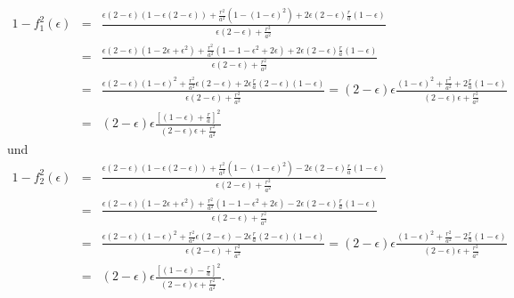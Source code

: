 \documentclass{book}
\begin{document}
\begin{eqnarray}
1 - f_1^2\left(\epsilon\right) & = & \frac{\epsilon\left(2 - \epsilon\right)\left(1 - \epsilon\left(2 - \epsilon\right)\right) + \frac{r^2}{a^2}\left(1 - \left(1 - \epsilon\right)^2\right) + 2\epsilon\left(2 - \epsilon\right)\frac{r}{a}\left(1 - \epsilon\right)}{\epsilon\left(2 - \epsilon\right) + \frac{r^2}{a^2}}\nonumber\\
& = & \frac{\epsilon\left(2 - \epsilon\right)\left(1 - 2\epsilon + \epsilon^2\right) + \frac{r^2}{a^2}\left(1 - 1 - \epsilon^2 + 2\epsilon\right) + 2\epsilon\left(2 - \epsilon\right)\frac{r}{a}\left(1 - \epsilon\right)}{\epsilon\left(2 - \epsilon\right) + \frac{r^2}{a^2}}\nonumber\\
& = & \frac{\epsilon\left(2 - \epsilon\right)\left(1 - \epsilon\right)^2 + \frac{r^2}{a^2}\epsilon\left(2 - \epsilon\right) + 2\epsilon\frac{r}{a}\left(2 - \epsilon\right)\left(1 - \epsilon\right)}{\epsilon\left(2 - \epsilon\right) + \frac{r^2}{a^2}} = \left(2 - \epsilon\right)\epsilon\frac{\left(1 - \epsilon\right)^2 + \frac{r^2}{a^2} + 2\frac{r}{a}\left(1 - \epsilon\right)}{\left(2 - \epsilon\right)\epsilon + \frac{r^2}{a^2}}\nonumber\\
& = & \left(2 - \epsilon\right)\epsilon\frac{\left[\left(1 - \epsilon\right) + \frac{r}{a}\right]^2}{\left(2 - \epsilon\right)\epsilon + \frac{r^2}{a^2}}
\end{eqnarray}
%
und
%
\begin{eqnarray}
1 - f_2^2\left(\epsilon\right) & = & \frac{\epsilon\left(2 - \epsilon\right)\left(1 - \epsilon\left(2 - \epsilon\right)\right) + \frac{r^2}{a^2}\left(1 - \left(1 - \epsilon\right)^2\right) - 2\epsilon\left(2 - \epsilon\right)\frac{r}{a}\left(1 - \epsilon\right)}{\epsilon\left(2 - \epsilon\right) + \frac{r^2}{a^2}}\nonumber\\
& = & \frac{\epsilon\left(2 - \epsilon\right)\left(1 - 2\epsilon + \epsilon^2\right) + \frac{r^2}{a^2}\left(1 - 1 - \epsilon^2 + 2\epsilon\right) - 2\epsilon\left(2 - \epsilon\right)\frac{r}{a}\left(1 - \epsilon\right)}{\epsilon\left(2 - \epsilon\right) + \frac{r^2}{a^2}}\nonumber\\
& = & \frac{\epsilon\left(2 - \epsilon\right)\left(1 - \epsilon\right)^2 + \frac{r^2}{a^2}\epsilon\left(2 - \epsilon\right) - 2\epsilon\frac{r}{a}\left(2 - \epsilon\right)\left(1 - \epsilon\right)}{\epsilon\left(2 - \epsilon\right) + \frac{r^2}{a^2}} = \left(2 - \epsilon\right)\epsilon\frac{\left(1 - \epsilon\right)^2 + \frac{r^2}{a^2} - 2\frac{r}{a}\left(1 - \epsilon\right)}{\left(2 - \epsilon\right)\epsilon + \frac{r^2}{a^2}}\nonumber\\
& = & \left(2 - \epsilon\right)\epsilon\frac{\left[\left(1 - \epsilon\right) - \frac{r}{a}\right]^2}{\left(2 - \epsilon\right)\epsilon + \frac{r^2}{a^2}}.
\end{eqnarray}
\end{document}
